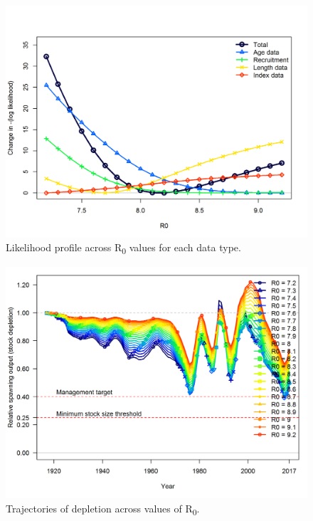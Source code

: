 \documentclass[12pt,]{article}
\begin{document}
\begin{figure}[htbp]
\centering
\includegraphics{Figures/profile_R0_like.png}
\caption{Likelihood profile across R\textsubscript{0} values for each
data type. \label{fig:profile_R0_like}}
\end{figure}

\begin{figure}[htbp]
\centering
\includegraphics{Figures/profile_R0_depl.png}
\caption{Trajectories of depletion across values of R\textsubscript{0}.
\label{fig:profile_R0_depl}}
\end{figure}

\FloatBarrier
\end{document}
